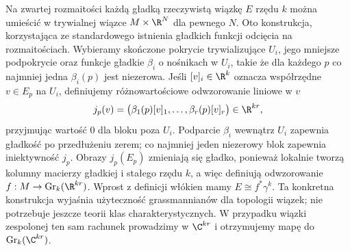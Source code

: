 \begin{uwaga}
Na zwartej rozmaitości każdą gładką rzeczywistą wiązkę $E$
rzędu $k$ można umieścić w trywialnej wiązce
$M\times\R^N$ dla pewnego $N$.
Oto konstrukcja, korzystająca ze standardowego
istnienia gładkich funkcji odcięcia na rozmaitościach.
Wybieramy skończone pokrycie trywializujące $U_i$,
jego mniejsze podpokrycie oraz funkcje gładkie $\beta_i$ o nośnikach w $U_i$,
takie że dla każdego $p$ co najmniej jedna
$\beta_i(p)$ jest niezerowa. Jeśli $[v]_i\in\R^k$
oznacza współrzędne $v\in E_p$ na $U_i$,
definiujemy różnowartościowe odwzorowanie liniowe w $v$
\[
 j_p(v)=\bigl(\beta_1(p)[v]_1,\ldots,
                  \beta_r(p)[v]_r\bigr)\in\R^{kr},
\]
przyjmując wartość $0$ dla bloku poza $U_i$.
Podparcie $\beta_i$ wewnątrz $U_i$ zapewnia
gładkość po przedłużeniu zerem; co najmniej
jeden niezerowy blok zapewnia iniektywność $j_p$.
Obrazy $j_p(E_p)$ zmieniają się gładko, ponieważ
lokalnie tworzą kolumny macierzy gładkiej i
stałego rzędu $k$, a więc definiują odwzorowanie
$f:M\to\operatorname{Gr}_k(\R^{kr})$.
Wprost z definicji włókien mamy
$E\cong f^*\gamma^k$. Ta konkretna konstrukcja
wyjaśnia użyteczność grassmannianów dla topologii
wiązek; nie potrzebuje jeszcze teorii klas
charakterystycznych.
W przypadku wiązki zespolonej ten sam rachunek
prowadzimy w $\C^{kr}$ i otrzymujemy mapę do
$\operatorname{Gr}_k(\C^{kr})$.
\end{uwaga}

